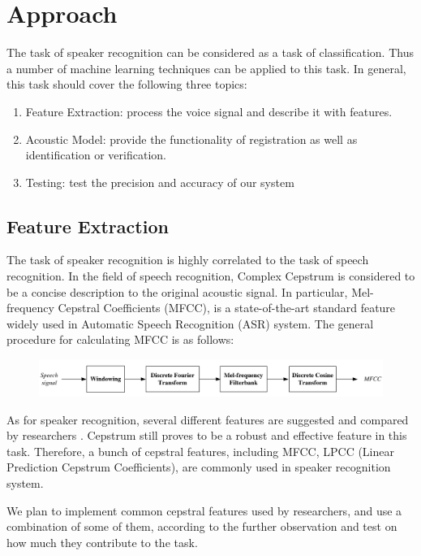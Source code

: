 

\section{Approach}
The task of speaker recognition can be considered as a task of classification. Thus a number of machine learning techniques
can be applied to this task. In general, this task should cover the following three topics:

\begin{enumerate}
  \item Feature Extraction: process the voice signal and describe it with features.

  \item Acoustic Model: provide the functionality of registration as well as identification or verification.

  \item Testing: test the precision and accuracy of our system
\end{enumerate}

\subsection{Feature Extraction}
The task of speaker recognition is highly correlated to the task of speech recognition.
In the field of speech recognition, Complex Cepstrum \cite{cepstrum} is
considered to be a concise description to the original acoustic signal.
In particular, Mel-frequency Cepstral Coefficients (MFCC), is a state-of-the-art standard feature
widely used in Automatic Speech Recognition (ASR) system.
The general procedure for calculating MFCC is as follows:
\begin{figure}[H]
  \centering
  \includegraphics[width=\textwidth]{res/MFCC.png}
\end{figure}

As for speaker recognition, several different features are suggested and compared
by researchers \cite{evaluation}. Cepstrum still proves to be a robust and effective
feature in this task. Therefore, a bunch of cepstral features, including MFCC,
LPCC (Linear Prediction Cepstrum Coefficients), are commonly used
in speaker recognition system.\cite{feature}

We plan to implement common cepstral features used by researchers, and use a
combination of some of them, according to the further observation and test on how
much they contribute to the task.

